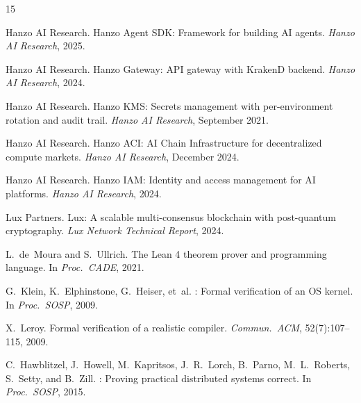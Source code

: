 \documentclass[11pt]{article}
\begin{document}
\begin{thebibliography}{15}

{Hanzo AI Research}.
\newblock Hanzo Agent {SDK}: Framework for building {AI} agents.
\newblock \emph{Hanzo AI Research}, 2025.

{Hanzo AI Research}.
\newblock Hanzo Gateway: {API} gateway with {KrakenD} backend.
\newblock \emph{Hanzo AI Research}, 2024.

{Hanzo AI Research}.
\newblock Hanzo {KMS}: Secrets management with per-environment rotation and audit trail.
\newblock \emph{Hanzo AI Research}, September 2021.

{Hanzo AI Research}.
\newblock Hanzo {ACI}: {AI} Chain Infrastructure for decentralized compute markets.
\newblock \emph{Hanzo AI Research}, December 2024.

{Hanzo AI Research}.
\newblock Hanzo {IAM}: Identity and access management for {AI} platforms.
\newblock \emph{Hanzo AI Research}, 2024.

{Lux Partners}.
\newblock Lux: A scalable multi-consensus blockchain with post-quantum cryptography.
\newblock \emph{Lux Network Technical Report}, 2024.

L.~de~Moura and S.~Ullrich.
\newblock The {Lean 4} theorem prover and programming language.
\newblock In \emph{Proc.\ CADE}, 2021.

G.~Klein, K.~Elphinstone, G.~Heiser, et~al.
: Formal verification of an {OS} kernel.
\newblock In \emph{Proc.\ SOSP}, 2009.

X.~Leroy.
\newblock Formal verification of a realistic compiler.
\newblock \emph{Commun.\ ACM}, 52(7):107--115, 2009.

C.~Hawblitzel, J.~Howell, M.~Kapritsos, J.~R.~Lorch, B.~Parno, M.~L.~Roberts,
S.~Setty, and B.~Zill.
: Proving practical distributed systems correct.
\newblock In \emph{Proc.\ SOSP}, 2015.

\end{thebibliography}
\end{document}
